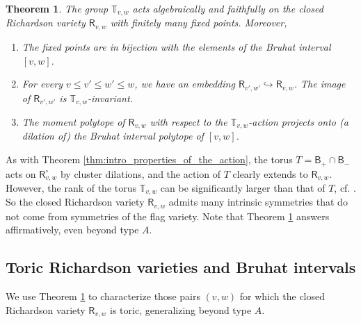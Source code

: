 \documentclass[a4paper, 11pt]{amsart}
\newcommand{\borel}{\mathsf{B}}
\newcommand{\orich}[1]{\mathsf{R}^{\circ}_{#1}}
\newcommand{\rich}[1]{\mathsf{R}_{#1}}
\newcommand{\dil}[1]{\mathbb{T}_{#1}}
\newtheorem{theorem}{Theorem}[section]
\theoremstyle{definition}
\begin{document}
\begin{theorem}\label{thm:richardson-intro}
    The group $\dil{v,w}$ acts algebraically and faithfully on the closed Richardson variety $\rich{v,w}$ with finitely many fixed points. Moreover,
    \begin{enumerate}
        \item The fixed points are in bijection with the elements of the Bruhat interval $[v,w]$.
        \item For every $v \leq v' \leq w' \leq w$, we have an embedding $\rich{v',w'} \hookrightarrow \rich{v,w}$. The image of $\rich{v',w'}$ is $\dil{v,w}$-invariant. 
        \item The moment polytope of $\rich{v,w}$ with respect to the $\dil{v,w}$-action projects onto (a dilation of) the Bruhat interval polytope of $[v,w]$. 
    \end{enumerate}
\end{theorem}

As with Theorem \ref{thm:intro_properties_of_the_action}, the torus $T = \borel_{+} \cap\borel_{-}$ acts on $\orich{v,w}$ by cluster dilations, and the action of $T$ clearly extends to $\rich{v,w}$. However, the rank of the torus $\dil{v,w}$ can be significantly larger than that of $T$, cf. \cite{hypercubes}. So the closed Richardson variety $\rich{v,w}$ admits many intrinsic symmetries that do not come from symmetries of the flag variety. 
Note that Theorem \ref{thm:richardson-intro} answers \cite[Question 1.6]{GKSB} affirmatively, even beyond type $A$. 

\subsection{Toric Richardson varieties and Bruhat intervals} We use Theorem \ref{thm:richardson-intro} to characterize those pairs $(v,w)$ for which the closed Richardson variety $\rich{v,w}$ is toric, generalizing  \cite[Theorem 1.2]{GKSB} beyond type $A$. 
\end{document}
